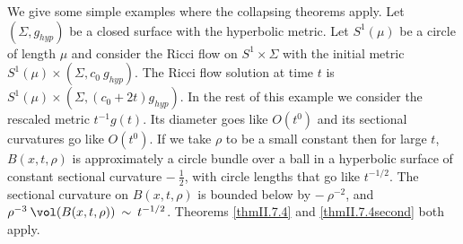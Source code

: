 \begin{remark}
  \label{rem:kl-thin-part-graph-manifold-existence-thick-thin-geometry}

We give some simple examples where the collapsing theorems apply.
Let $(\Sigma, g_{hyp})$ be a closed surface with the hyperbolic
metric.  Let $S^1(\mu)$ be a circle of length $\mu$ and consider
the Ricci flow on $S^1 \times \Sigma$ with the initial metric
$S^1(\mu) \times (\Sigma, c_0 \: g_{hyp})$. The Ricci flow solution at
time $t$ is $S^1(\mu) \times (\Sigma, (c_0 + 2t) g_{hyp})$.
In the rest of this example we consider
the rescaled metric $t^{-1} g(t)$.
Its diameter goes like
$O(t^0)$ and its sectional curvatures  go like $O(t^0)$. If we
take $\rho$ to be a small constant then for large $t$,
$B(x, t, \rho)$ is approximately a circle bundle over a ball in a hyperbolic surface
of constant sectional curvature $- \: \frac12$, with circle lengths
that go like $t^{-1/2}$. The sectional curvature on
$B(x, t, \rho)$ is bounded below by $- \: \rho^{-2}$, and
$\rho^{-3} \: \vol(B(x, t, \rho)) \: \sim \: t^{-1/2}$.
Theorems \ref{thmII.7.4}
and \ref{thmII.7.4second} both apply.


\end{remark}
